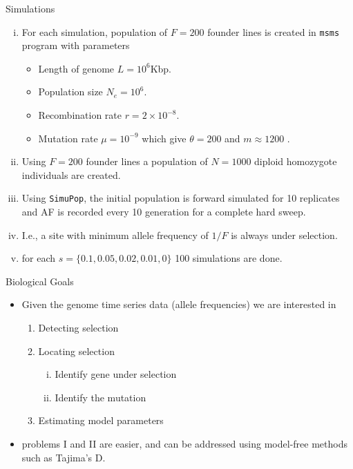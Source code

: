 \documentclass[t]{beamer} %
\begin{document}
\begin{frame}{Simulations}
\begin{enumerate}[(i)]
\item For each simulation, population of $F=200$ founder lines is created in  \texttt{msms} program with parameters 
\begin{itemize}
\item Length of genome $L=10^6$Kbp.
\item Population size $N_e=10^6$.
\item Recombination rate $r=2\times10^{-8}$.
\item Mutation rate $\mu=10^{-9}$ which give $\theta = 200$ and $m\approx 1200$ .
\end{itemize}

\item Using $F=200$ founder lines a population of $N=1000$ diploid homozygote individuals are created.
\item Using \texttt{SimuPop}, the initial population is forward simulated for 10 replicates and AF is recorded every 10 generation for a complete hard sweep. 
\item I.e., a site with minimum allele frequency of $1/F$ is always under selection.
\item for each $s=\{0.1, 0.05, 0.02, 0.01, 0\}$ 100 simulations are done.
\end{enumerate}
\end{frame}

\begin{frame}{Biological Goals}
\begin{itemize}
\item Given the genome time series data (allele frequencies) we are interested in
\begin{enumerate}[I]
\item Detecting selection 
\item Locating selection
\begin{enumerate}[(i)]
 \item Identify gene under selection
 \item Identify the mutation 
\end{enumerate}
\item Estimating model parameters
\end{enumerate}
\item  problems I and II are easier, and can be addressed using model-free methods such as Tajima's D.
\end{itemize}
\end{frame}
\end{document}

